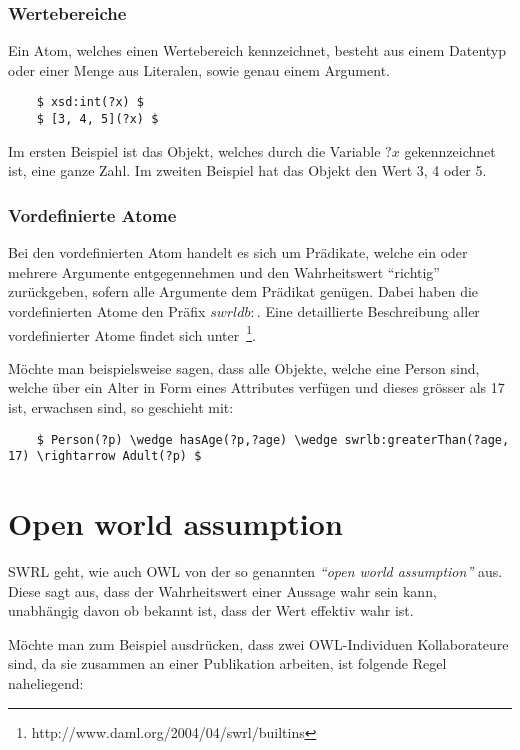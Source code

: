 \subsubsection{Wertebereiche}
\label{ssubsec:swrl_aufbau_atomaretypen_wertebereiche}
Ein Atom, welches einen Wertebereich kennzeichnet, besteht aus einem Datentyp oder einer Menge aus Literalen, sowie genau einem Argument. 
\lstset{language=XML}
\begin{lstlisting}
    $ xsd:int(?x) $
    $ [3, 4, 5](?x) $
\end{lstlisting}
Im ersten Beispiel ist das Objekt, welches durch die Variable $?x$ gekennzeichnet ist, eine ganze Zahl. Im zweiten Beispiel hat das Objekt den Wert 3, 4 oder 5.

\subsubsection{Vordefinierte Atome}
\label{ssubsec:swrl_aufbau_atomaretypen_vordefinierteatome}
Bei den vordefinierten Atom handelt es sich um Prädikate, welche ein oder mehrere Argumente entgegennehmen und den Wahrheitswert ``richtig'' zurückgeben, sofern alle Argumente dem Prädikat genügen. Dabei haben die vordefinierten Atome den Präfix $ swrldb: $. Eine detaillierte Beschreibung aller vordefinierter Atome findet sich unter~\footnote{http://www.daml.org/2004/04/swrl/builtins}.

Möchte man beispielsweise sagen, dass alle Objekte, welche eine Person sind, welche über ein Alter in Form eines Attributes verfügen und dieses grösser als 17 ist, erwachsen sind, so geschieht mit:
\lstset{language=XML}
\begin{lstlisting}
    $ Person(?p) \wedge hasAge(?p,?age) \wedge swrlb:greaterThan(?age, 17) \rightarrow Adult(?p) $
\end{lstlisting}

\section{Open world assumption}
\label{sec:swrl_openworldassumption}
SWRL geht, wie auch OWL von der so genannten \textit{``open world assumption''} aus. Diese sagt aus, dass der Wahrheitswert einer Aussage wahr sein kann, unabhängig davon ob bekannt ist, dass der Wert effektiv wahr ist.

Möchte man zum Beispiel ausdrücken, dass zwei OWL-Individuen Kollaborateure sind, da sie zusammen an einer Publikation arbeiten, ist folgende Regel naheliegend:

